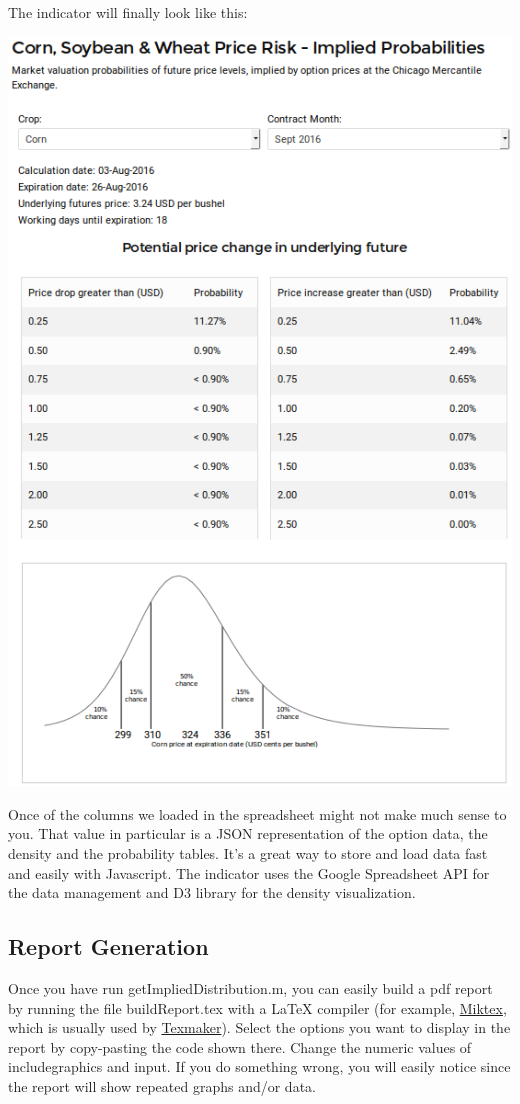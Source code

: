 \documentclass[10pt,a4paper]{book}
\begin{document}
\pagebreak

The indicator will finally look like this:

\begin{center}
  \includegraphics[scale=0.7]{images/indicator}
\end{center}

Once of the columns we loaded in the spreadsheet might not make much sense to you. That value in particular is a JSON representation of the option data, the density and the probability tables. It's a great way to store and load data fast and easily with Javascript. The indicator uses the Google Spreadsheet API for the data management and D3 library for the density visualization.

\pagebreak

\subsection{Report Generation}
Once you have run getImpliedDistribution.m, you can easily build a pdf report by running the file buildReport.tex with a LaTeX compiler (for example, \href{www.miktex.org}{Miktex}, which is usually used by \href{http://www.xm1math.net/texmaker/}{Texmaker}). Select the options you want to display in the report by copy-pasting the code shown there. Change the numeric values of includegraphics and input. If you do something wrong, you will easily notice since the report will show repeated graphs and/or data.
\end{document}
